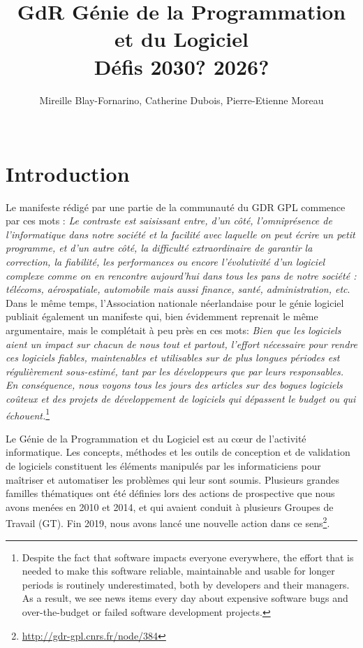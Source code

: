 \documentclass[11pt]{article}
\title{GdR Génie de la Programmation et du Logiciel\\ 
Défis 2030? 2026?}
\author{Mireille Blay-Fornarino, Catherine Dubois, Pierre-Etienne Moreau\\
\\
}
\begin{document}
\maketitle

\section{Introduction}

Le manifeste rédigé par une partie de la communauté du GDR GPL commence par ces mots : \emph{Le contraste est saisissant entre, d’un côté, l’omniprésence de l’informatique dans notre
société et la facilité avec laquelle on peut écrire un petit programme, et d’un autre côté, la difficulté extraordinaire de garantir la correction, la fiabilité, les performances ou encore
l’évolutivité d’un logiciel complexe comme on en rencontre aujourd’hui dans tous les pans
de notre société : télécoms, aérospatiale, automobile mais aussi finance, santé,
administration, etc}\cite{Manifeste}.
Dans le même temps, l'Association nationale néerlandaise pour le génie logiciel publiait également un manifeste \cite{Nederland2019} qui, bien évidemment reprenait le même argumentaire, mais le complétait à peu près en ces mots:  \emph{Bien que les logiciels aient un impact sur chacun de nous tout et partout, l'effort nécessaire pour rendre ces logiciels fiables, maintenables et utilisables sur de plus longues périodes est régulièrement sous-estimé, tant par les développeurs que par leurs responsables. En conséquence, nous voyons tous les jours des articles sur des bogues logiciels coûteux et des projets de développement de logiciels qui dépassent le budget ou qui échouent.}\footnote{Despite the fact that software impacts everyone everywhere, the effort that is needed to make this software reliable,
maintainable and usable for longer periods is routinely underestimated, both by developers and their managers. As a result,
we see news items every day about expensive software bugs and over-the-budget or failed software development projects\cite{Nederland2019}.}





Le Génie de la Programmation et du Logiciel est au c{\oe}ur de l'activité
informatique. Les concepts, méthodes et les outils de conception et de
validation de logiciels constituent les éléments manipulés par les
informaticiens pour maîtriser et automatiser les problèmes qui leur sont
soumis. 
Plusieurs grandes familles thématiques ont été définies lors des actions de prospective que nous avons menées en 2010 et 2014, et qui avaient conduit à plusieurs Groupes de Travail (GT). 
Fin 2019, nous avons lancé une nouvelle action dans ce sens\footnote{\url{http://gdr-gpl.cnrs.fr/node/384}}. %
\end{document}
